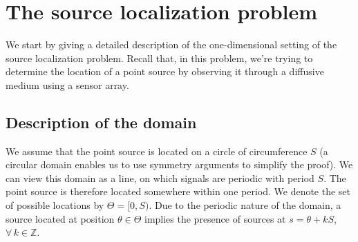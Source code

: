 \documentclass[conference]{IEEEtran}
\begin{document}


\section{The source localization problem}
\label{sec:source-localization}

We start by giving a detailed description of the one-dimensional setting of the
source localization problem. Recall that, in this problem, we're trying to
determine the location of a point source by observing it through a diffusive
medium using a sensor array.

\subsection{Description of the domain}

We assume that the point source is located on a circle of circumference $S$ (a
circular domain enables us to use symmetry arguments to simplify the proof). We
can view this domain as a line, on which signals are periodic with period $S$.
The point source is therefore located somewhere within one period. We denote
the set of possible locations by $\Theta = [0, S)$. Due to the periodic nature
of the domain, a source located at position $\theta \in \Theta$ implies the
presence of sources at $s = \theta + kS$,~$\forall \, k \in \mathbb Z$.
\end{document}
